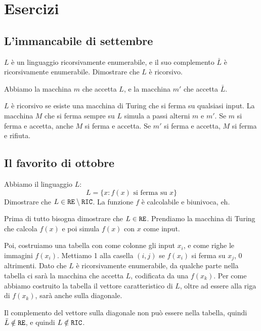 \documentclass[draft]{lecturenotes}
\begin{document}


\chapter{Esercizi}

\section{L'immancabile di settembre}

\begin{esercizio}
$L$ \`e un linguaggio ricorsivamente enumerabile, e il suo complemento $\bar{L}$ \`e ricorsivamente enumerabile. Dimostrare che $L$ \`e ricorsivo.
\end{esercizio}

Abbiamo la macchina $m$ che accetta $L$, e la macchina $m'$ che accetta $\bar{L}$.

$L$ \`e ricorsivo se esiste una macchina di Turing che si ferma su qualsiasi input. La macchina $M$ che si ferma sempre su $L$ simula a passi alterni $m$ e $m'$. Se $m$ si ferma e accetta, anche $M$ si ferma e accetta. Se $m'$ si ferma e accetta, $M$ si ferma e rifiuta.

\section{Il favorito di ottobre}

\begin{esercizio}
Abbiamo il linguaggio $L$:
\[
L = \{ x : f(x) \text{ si ferma su } x \}
\]
Dimostrare che $L \in \texttt{RE} \setminus \texttt{RIC}$. La funzione $f$ \`e calcolabile e biunivoca, eh.
\end{esercizio}

Prima di tutto bisogna dimostrare che $L \in \texttt{RE}$. Prendiamo la macchina di Turing che calcola $f(x)$ e poi simula $f(x)$ con $x$ come input.

Poi, costruiamo una tabella con come colonne gli input $x_i$, e come righe le immagini $f(x_i)$. Mettiamo 1 alla casella $(i,j)$ se $f(x_i)$ si ferma su $x_j$, 0 altrimenti. Dato che $L$ \`e ricorsivamente enumerabile, da qualche parte nella tabella ci sar\`a la macchina che accetta $L$, codificata da una $f(x_k)$. Per come abbiamo costruito la tabella il vettore caratteristico di $L$, oltre ad essere alla riga di $f(x_k)$, sar\`a anche sulla diagonale.

Il complemento del vettore sulla diagonale non pu\`o essere nella tabella, quindi $\bar{L} \notin \texttt{RE}$, e quindi $L \notin \texttt{RIC}$.
\end{document}
